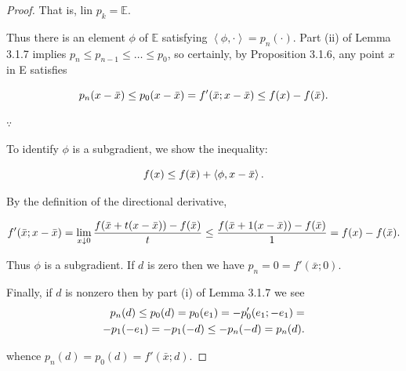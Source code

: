 \documentclass[a4paper,11pt]{jsarticle}
\begin{document}
\begin{proof}
  That is, $\text{lin } p_k = \mathbb{E}$.

  Thus there is an element $\phi$ of $\mathbb{E}$ satisfying $\left\langle \phi ,\cdot \right\rangle = p_n(\cdot)$. Part (ii) of Lemma 3.1.7 implies $p_n \leq p_{n-1} \leq \dots \leq p_0$, so certainly, by Proposition 3.1.6, any point $x$ in E satisfies

  \begin{equation}
    p_n(x-\bar{x}) \leq p_0(x-\bar{x}) = f'(\bar{x}; x-\bar{x}) \leq f(x) - f(\bar{x}). \notag
  \end{equation}

  $\because$

  To identify $\phi$ is a subgradient, we show the inequality:

  \begin{equation}
    f(x) \leq f(\bar{x}) + \left\langle \phi , x - \bar{x}\right\rangle. \notag
  \end{equation}

  By the definition of the directional derivative,

  \begin{equation}
    f'(\bar{x}; x - \bar{x}) = \lim_{x \downarrow 0 } \frac{f(\bar{x} + t(x - \bar{x})) - f(\bar{x})}{t} \leq \frac{f(\bar{x} + 1(x - \bar{x})) - f(\bar{x})}{1} = f(x) - f(\bar{x}). \notag
  \end{equation}

  Thus $\phi$ is a subgradient. If $d$ is zero then we have $p_n = 0 = f'(\bar{x}; 0)$.

  Finally, if $d$ is nonzero then by part (i) of Lemma 3.1.7 we see
  \begin{align}
    p_n(d) \leq p_0(d) = p_0(e_1) = -p_0'(e_1; -e_1) = \notag \\
    -p_1(-e_1) = -p_1(-d) \leq -p_n(-d) = p_n(d). \notag
  \end{align}

  whence $p_n(d) = p_0(d) = f'(\bar{x}; d)$.

\end{proof}
\end{document}
